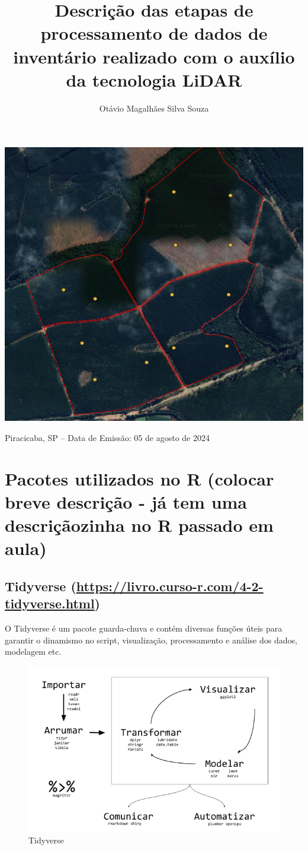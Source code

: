 \documentclass[
]{article}
\title{Descrição das etapas de processamento de dados de inventário
realizado com o auxílio da tecnologia LiDAR}
\author{Otávio Magalhães Silva Souza}
\date{}
\begin{document}
\maketitle

\begin{center}\includegraphics[width=0.4\linewidth]{IMAGES/CAPA} \end{center}

\centerline {Piracicaba, SP – Data de Emissão: 05 de agosto de 2024}
\newpage

\tableofcontents

\newpage

\section{Pacotes utilizados no R (colocar breve descrição - já tem uma
descriçãozinha no R passado em
aula)}\label{pacotes-utilizados-no-r-colocar-breve-descriuxe7uxe3o---juxe1-tem-uma-descriuxe7uxe3ozinha-no-r-passado-em-aula}

\subsection{\texorpdfstring{Tidyverse
(\url{https://livro.curso-r.com/4-2-tidyverse.html})}{Tidyverse (https://livro.curso-r.com/4-2-tidyverse.html)}}\label{tidyverse-httpslivro.curso-r.com4-2-tidyverse.html}

O Tidyverse é um pacote guarda-chuva e contém diversas funções úteis
para garantir o dinamismo no script, visualização, processamento e
análise dos dados, modelagem etc.

\begin{figure}

{\centering \includegraphics[width=0.6\linewidth]{IMAGES/tidyverse} 

}

\caption{Tidyverse}\label{fig:unnamed-chunk-2}
\end{figure}
\end{document}
